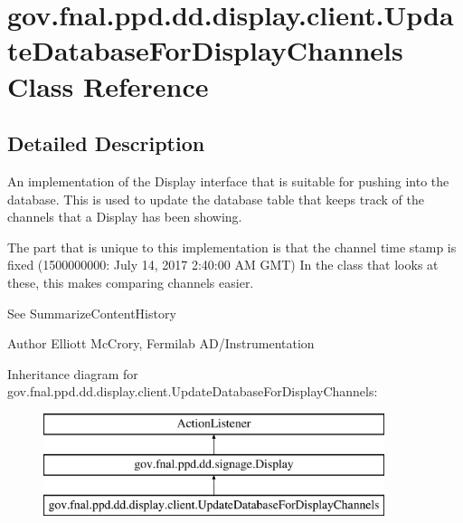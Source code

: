 \hypertarget{classgov_1_1fnal_1_1ppd_1_1dd_1_1display_1_1client_1_1UpdateDatabaseForDisplayChannels}{\section{gov.\-fnal.\-ppd.\-dd.\-display.\-client.\-Update\-Database\-For\-Display\-Channels Class Reference}
\label{classgov_1_1fnal_1_1ppd_1_1dd_1_1display_1_1client_1_1UpdateDatabaseForDisplayChannels}
}


\subsection{Detailed Description}
An implementation of the Display interface that is suitable for pushing into the database. This is used to update the database table that keeps track of the channels that a Display has been showing. 

The part that is unique to this implementation is that the channel time stamp is fixed (1500000000\-: July 14, 2017 2\-:40\-:00 A\-M G\-M\-T) In the class that looks at these, this makes comparing channels easier. 

See Summarize\-Content\-History 

\begin{DoxyAuthor}{Author}
Elliott Mc\-Crory, Fermilab A\-D/\-Instrumentation 
\end{DoxyAuthor}
Inheritance diagram for gov.\-fnal.\-ppd.\-dd.\-display.\-client.\-Update\-Database\-For\-Display\-Channels\-:\begin{figure}[H]
\begin{center}
\leavevmode
\includegraphics[height=3.000000cm]{classgov_1_1fnal_1_1ppd_1_1dd_1_1display_1_1client_1_1UpdateDatabaseForDisplayChannels}
\end{center}
\end{figure}

